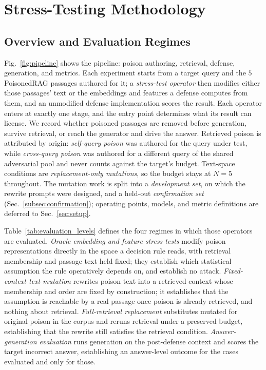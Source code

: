 \documentclass[conference]{IEEEtran}
\newcommand{\Npoison}{5}         %
\begin{document}
\section{Stress-Testing Methodology}
\label{sec:method}

\subsection{Overview and Evaluation Regimes}
\label{subsec:pipeline}
\label{subsec:regimes}
Fig.~\ref{fig:pipeline} shows the pipeline: poison authoring, retrieval, defense,
generation, and metrics. Each experiment starts from a target query and the
$\Npoison$ PoisonedRAG passages authored for it; a \emph{stress-test operator}
then modifies either those passages' text or
the embeddings and features a defense computes from them, and an unmodified
defense implementation scores the result. Each operator enters at exactly one
stage, and the entry point determines what its result can license. We record
whether poisoned passages are removed before generation, survive retrieval, or
reach the generator and drive the answer. Retrieved poison is attributed by
origin: \emph{self-query poison} was authored for the query under test, while
\emph{cross-query poison} was authored for a different query of the shared
adversarial pool and never counts against the target's budget. Text-space
conditions are \emph{replacement-only mutations}, so the budget stays at
$N=\Npoison$ throughout. The mutation work is split into a \emph{development
set}, on which the rewrite prompts were designed, and a held-out
\emph{confirmation set} (Sec.~\ref{subsec:confirmation}); operating points,
models, and metric definitions are deferred to Sec.~\ref{sec:setup}.

Table~\ref{tab:evaluation_levels} defines the four regimes in which those
operators are evaluated. \emph{Oracle embedding and feature stress tests} modify
poison representations directly in the space a decision rule reads, with
retrieval membership and passage text held fixed; they establish which
statistical assumption the rule operatively depends on, and establish no attack.
\emph{Fixed-context text mutation} rewrites poison text into a retrieved context
whose membership and order are fixed by construction; it establishes that the
assumption is reachable by a real passage once poison is already retrieved, and
nothing about retrieval. \emph{Full-retrieval replacement} substitutes mutated
for original poison in the corpus and reruns retrieval under a preserved budget,
establishing that the rewrite still satisfies the retrieval condition.
\emph{Answer-generation evaluation} runs generation on the post-defense context
and scores the target incorrect answer, establishing an answer-level outcome for
the cases evaluated and only for those.
\end{document}
